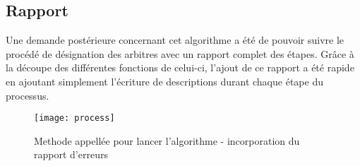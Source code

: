 \subsection{Rapport}
\vspace{1cm}

Une demande postérieure concernant cet algorithme a été de pouvoir suivre le procédé de désignation des arbitres avec un rapport complet des étapes. 
Grâce à la découpe des différentes fonctions de celui-ci, l’ajout de ce rapport a été rapide en ajoutant simplement l’écriture de descriptions durant chaque étape du processus.

\begin{figure}[!h]
    \centering
    \texttt{[image: process]}
    \caption{Methode appellée pour lancer l'algorithme - incorporation du rapport d'erreurs}
\end{figure}
